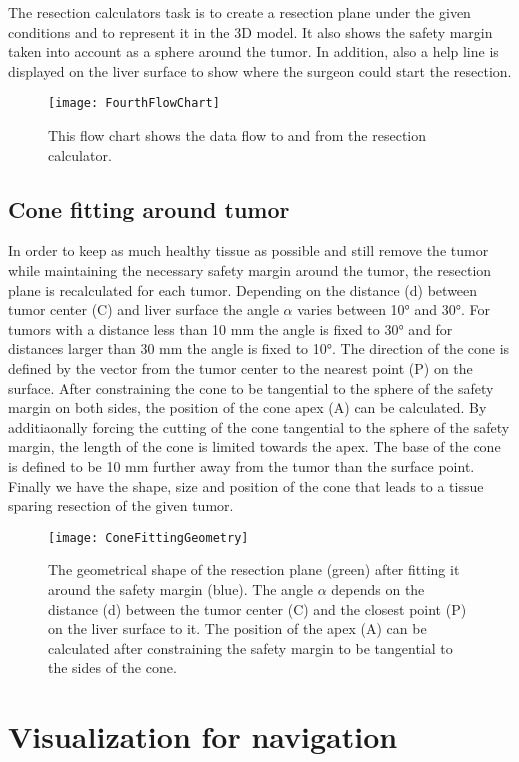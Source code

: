 The resection calculators task is to create a resection plane under the given
conditions and to represent it in the 3D model. It also shows the safety margin taken
into account as a sphere around the tumor. In addition, also a help line is displayed
on the liver surface to show where the surgeon could start the resection.
\begin{figure}[H]
  \centering
 \texttt{[image: FourthFlowChart]}
  \caption{This flow chart shows the data flow to and from the resection calculator.}
  \label{fig:FourthFlowChart}
\end{figure}

\subsection{Cone fitting around tumor}
In order to keep as much healthy tissue as possible and still remove the tumor
while maintaining the necessary safety margin around the tumor, the resection
plane is recalculated for each tumor. Depending on the distance (d) between tumor
center (C) and liver surface the angle $\alpha$ varies between 10° and 30°. For
tumors with a distance less than 10 mm the angle is fixed to 30° and for
distances larger than 30 mm the angle is fixed to 10°. The direction of the cone
is defined by the vector from the tumor center to the nearest point (P) on the
surface. After constraining the cone to be tangential to the sphere of the
safety margin on both sides, the position of the cone apex (A) can be calculated. By
additiaonally forcing the cutting of the cone tangential to the sphere of the
safety margin, the length of the cone is limited towards the apex. The base of
the cone is defined to be 10 mm further away from the tumor than the surface
point. Finally we have the shape, size and position of the cone that leads to a
tissue sparing resection of the given tumor.
\begin{figure}[H]
  \centering
 \texttt{[image: ConeFittingGeometry]}
  \caption{The geometrical shape of the resection plane (green) after fitting it
  around the safety margin (blue). The angle $\alpha$ depends on the distance (d)
  between the tumor center (C) and the closest point (P) on the liver surface to
  it. The position of the apex (A) can be calculated after constraining the
  safety margin to be tangential to the sides of the cone.}
  \label{fig:ConeFittingGeometry}
\end{figure}

\section{Visualization for navigation}

